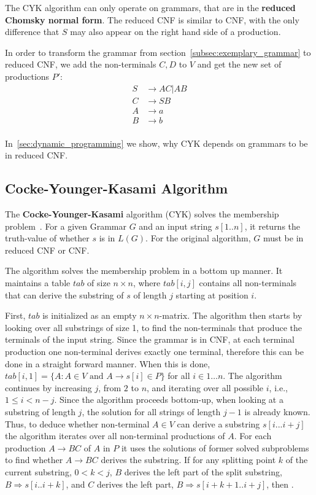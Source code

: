 The CYK algorithm can only operate on grammars, that are in the \textbf{reduced Chomsky normal form}.
The reduced CNF is similar to CNF, with the only difference that $S$ may also appear on the right hand side of a production.

In order to transform the grammar from section~\ref{subsec:exemplary_grammar} to reduced CNF, we add the non-terminals $C,D$ to $V$ and get the new set of productions $P'$:
\begin{align*}
    S&\rightarrow AC | AB \\
    C&\rightarrow SB \\
    A&\rightarrow a \\
    B&\rightarrow b \\
\end{align*}

In~\ref{sec:dynamic_programming} we show, why CYK depends on grammars to be in reduced CNF.

\subsection{Cocke-Younger-Kasami Algorithm}

The \textbf{Cocke-Younger-Kasami} algorithm (CYK) solves the membership problem~\cite{automata}.
For a given Grammar $G$ and an input string $s[1..n]$, it returns the truth-value of whether $s$ is in $L(G)$.
For the original algorithm, $G$ must be in reduced CNF or CNF.

The algorithm solves the membership problem in a bottom up manner.
It maintains a table $tab$ of size $n\times n$, where $tab[i,j]$ contains all non-terminals that can derive the substring of $s$ of length $j$ starting at position $i$.

First, $tab$ is initialized as an empty $n\times n$-matrix.
The algorithm then starts by looking over all substrings of size 1, to find the non-terminals that produce the terminals of the input string.
Since the grammar is in CNF, at each terminal production one non-terminal derives exactly one terminal, therefore this can be done in a straight forward manner.
When this is done, $tab[i,1]=\{A: A\in V \text{ and } A\rightarrow s[i] \in P\}$ for all $i\in {1\dots n}$.
The algorithm continues by increasing $j$, from $2$ to $n$, and iterating over all possible $i$, i.e., $1\leq i < n-j$.
Since the algorithm proceeds bottom-up, when looking at a substring of length $j$, the solution for all strings of length $j-1$ is already known.
Thus, to deduce whether non-terminal $A\in V$ can derive a substring $s[i...i+j]$ the algorithm iterates over all non-terminal productions of $A$.
For each production $A\rightarrow BC$ of $A$ in $P$ it uses the solutions of former solved subproblems to find whether $A\rightarrow BC$ derives the substring.
If for any splitting point $k$ of the current substring, $0 < k < j$, $B$ derives the left part of the split substring, $B\Rightarrow s[i..i+k]$, and $C$ derives the left part, $B\Rightarrow s[i+k+1..i+j]$, then .

